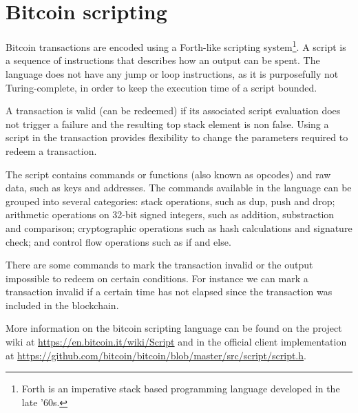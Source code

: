 \section{Bitcoin scripting} \label{sec:appendix_script}

Bitcoin transactions are encoded using a Forth-like scripting
 system\footnote{Forth is an imperative stack based programming language
                 developed in the late '60s.}.
A script is a sequence of instructions that describes how an output can be
  spent.
The language does not have any jump or loop instructions, as it is purposefully
  not Turing-complete, in order to keep the execution time of a script bounded.

A transaction is valid (can be redeemed) if its associated script evaluation
  does not trigger a failure and the resulting top stack element is non false.
Using a script in the transaction provides flexibility to change the
  parameters required to redeem a transaction.

The script contains commands or functions (also known as opcodes) and raw data,
  such as keys and addresses.
The commands available in the language can be grouped into several categories:
  stack operations, such as dup, push and drop;
  arithmetic operations on 32-bit signed integers, such as addition,
    substraction and comparison;
  cryptographic operations such as hash calculations and signature check;
  and control flow operations such as if and else.

There are some commands to mark the transaction invalid or the output impossible
  to redeem on certain conditions. For instance we can mark a transaction invalid
  if a certain time has not elapsed since the transaction was included in the
  blockchain.

More information on the bitcoin scripting language can be found on the project
  wiki at \url{https://en.bitcoin.it/wiki/Script} and in the official client
  implementation at
  \url{https://github.com/bitcoin/bitcoin/blob/master/src/script/script.h}.
